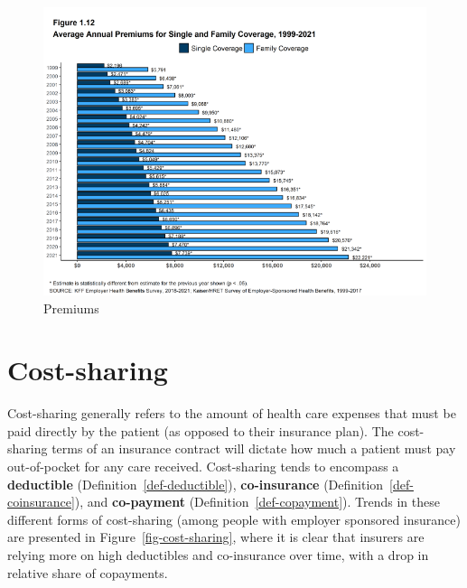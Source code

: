 \documentclass[
  letterpaper,
  DIV=11,
  numbers=noendperiod]{scrreport}
\theoremstyle{definition}
\theoremstyle{remark}
\begin{document}
\begin{figure}

{\centering \includegraphics{part1/../figures/kff-premiums.webp}

}

\caption{\label{fig-premiums}Premiums}

\end{figure}

\hypertarget{cost-sharing}{%
\section{Cost-sharing}\label{cost-sharing}}

Cost-sharing generally refers to the amount of health care expenses that
must be paid directly by the patient (as opposed to their insurance
plan). The cost-sharing terms of an insurance contract will dictate how
much a patient must pay out-of-pocket for any care received.
Cost-sharing tends to encompass a \textbf{deductible}
(Definition~\ref{def-deductible}), \textbf{co-insurance}
(Definition~\ref{def-coinsurance}), and \textbf{co-payment}
(Definition~\ref{def-copayment}). Trends in these different forms of
cost-sharing (among people with employer sponsored insurance) are
presented in Figure~\ref{fig-cost-sharing}, where it is clear that
insurers are relying more on high deductibles and co-insurance over
time, with a drop in relative share of copayments.
\end{document}
